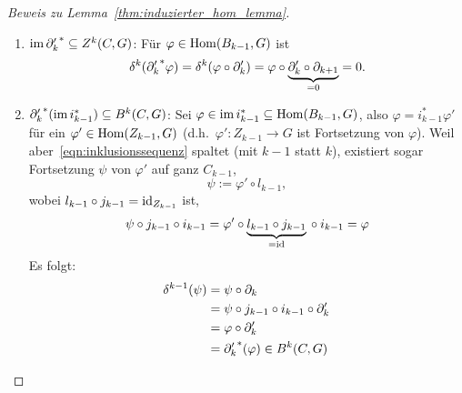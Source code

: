 \begin{proof}[Beweis zu Lemma~\ref{thm:induzierter_hom_lemma}]
  \begin{enumerate}
    \item
      $\operatorname{im} {\partial'_k}^* \subseteq Z^k(C,G)$:
      Für $\varphi \in \mathrm{Hom}(B_{k-1},G)$ ist
      \begin{equation*}
        \delta^k({\partial'_k}^* \varphi) = \delta^k(\varphi \circ \partial'_k) = \varphi \circ \underbrace{\partial'_k \circ \partial_{k+1}}_{=0} = 0.
      \end{equation*}
    \item
      ${\partial'_k}^* (\operatorname{im} i_{k-1}^*) \subseteq B^k(C,G)$:
        Sei $\varphi \in \operatorname{im} i_{k-1}^* \subseteq \mathrm{Hom}(B_{k-1},G)$, also $\varphi = i_{k-1}^* \varphi'$ für ein $\varphi' \in \mathrm{Hom}(Z_{k-1},G)$ (d.h.\ $\varphi'\colon Z_{k-1} \to G$ ist Fortsetzung von $\varphi$).
        Weil aber~\eqref{eqn:inklusionssequenz} spaltet (mit $k-1$ statt $k$), existiert sogar Fortsetzung $\psi$ von $\varphi'$ auf ganz $C_{k-1}$,
        \begin{equation*}
          \psi := \varphi' \circ l_{k-1},
        \end{equation*}
        wobei $l_{k-1} \circ j_{k-1} = \operatorname{id}_{Z_{k-1}}$ ist,
        \begin{equation*}
          \psi \circ j_{k-1} \circ i_{k-1} = \varphi' \circ \underbrace{l_{k-1} \circ j_{k-1}}_{=\operatorname{id}} {}\circ i_{k-1} = \varphi
        \end{equation*}
        Es folgt:
        \begin{align*}
          \delta^{k-1} (\psi)
            & = \psi \circ \partial_k\\
            & = \psi \circ j_{k-1} \circ i_{k-1} \circ \partial'_k\\
            & = \varphi \circ \partial'_k\\
            & = {\partial'_k}^* (\varphi) \in B^k(C,G)
        \end{align*}
  \end{enumerate}
\end{proof}
